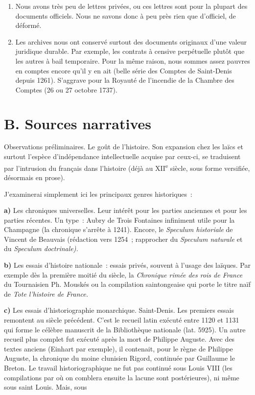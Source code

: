 \documentclass[french,twoside]{book} %
\newcommand{\labelchar}[1]{\textbf{\color{rubric} #1}}
\begin{document}
\begin{enumerate}[itemsep=0pt,]
\item Nous avons très peu de lettres privées, ou ces lettres sont pour la plupart des documents officiels. Nous ne savons donc à peu près rien que d’officiel, de déformé.
\item Les archives nous ont conservé surtout des documents originaux d’une valeur juridique durable. Par exemple, les contrats à censive perpétuelle plutôt que les autres à bail temporaire. Pour la même raison, nous sommes assez pauvres en comptes encore qu’il y en ait (belle série des Comptes de Saint-Denis depuis 1261). S’aggrave pour la Royauté de l’incendie de la Chambre des Comptes (26 ou 27 octobre 1737).
\end{enumerate}

\section[{B. Sources narratives}]{B. Sources narratives}
\label{c01b}
\noindent Observations préliminaires. Le goût de l’histoire. Son expansion chez les laïcs et surtout l’espèce d’indépendance intellectuelle acquise par ceux-ci, se traduisent par l’intrusion du français dans l’histoire (déjà au XII\textsuperscript{e} siècle, sous forme versifiée, désormais en prose).\par
J’examinerai simplement ici les principaux genres historiques :\par
\bigbreak
\noindent \labelchar{a)} Les chroniques universelles. Leur intérêt pour les parties anciennes et pour les parties récentes. Un type : Aubry de Trois Fontaines infiniment utile pour la Champagne (la chronique s’arrête à 1241). Encore, le {\itshape Speculum historiale} de Vincent de Beauvais (rédaction vers 1254 ; rapprocher du {\itshape Speculum naturale} et du {\itshape Speculum doctrinale).}\par
\bigbreak
\noindent \labelchar{b)} Les essais d’histoire nationale : essais privés, souvent à l’usage des laïques. Par exemple dès la première moitié du siècle, la {\itshape Chronique rimée des rois de France} du Tournaisien Ph. Mouskés ou la compilation saintongeaise qui porte le titre naïf de {\itshape Tote l’histoire de France.}\par
\bigbreak
\noindent \labelchar{c)} Les essais d’historiographie monarchique. Saint-Denis. Les premiers essais remontent au siècle précédent. C’est le recueil latin exécuté entre 1120 et 1131 qui forme le célèbre manuscrit de la Bibliothèque nationale (lat. 5925). Un autre recueil plus complet fut exécuté après la mort de Philippe Auguste. Avec des textes anciens (Einhart par exemple), il contenait, pour le règne de Philippe Auguste, la chronique du moine clunisien Rigord, continuée par Guillaume le Breton. Le travail historiographique ne fut pas continué sous Louis VIII (les compilations par où on comblera ensuite la lacune sont postérieures), ni même sous saint Louis. Mais, sous  
\end{document}
